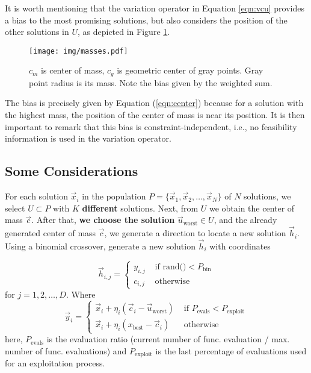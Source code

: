 \documentclass[12pt,letterpape]{article}
\begin{document}
It is worth mentioning that the variation operator in Equation \ref{eqn:vcu} 
provides a bias to the most promising solutions, but also considers the position 
of the other solutions in $U$, as depicted in  Figure \ref{fig:masses}. 

\begin{figure}[!ht]
	\centering
	\texttt{[image: img/masses.pdf]}
	\caption{$c_m$ is center of mass, $c_g$ is geometric center of gray points. %
	Gray point radius is its mass. Note the bias given by the weighted sum.}
	\label{fig:masses}       %
\end{figure}
%
%
The bias is precisely given by Equation (\ref{eqn:center}) because for a solution 
with the highest mass, the position of the center of mass is near  
its position. It is then important to remark that this bias is constraint-independent, i.e., 
no feasibility information is used in the variation operator. 
%

\subsection{Some Considerations} %
\label{sub:some_considerations}


For each solution $\vec{x}_i $ in the population $P = \{ \vec{x}_1, \vec{x}_2, \ldots, \vec{x}_{N} \} $ of $N$ 
solutions, we select $U \subset P $ with $K$ \textbf{different} solutions. Next, 
from $U$ we obtain the center of mass $\vec{c}$. After that, \textbf{we choose the solution} $\vec{u}_{\text{worst}} \in U$,  
and the already generated center of mass $\vec{c}$, we generate a direction 
to locate a new solution $ \vec{h}_i$. Using a binomial crossover, generate a new solution $\vec{h}_{i}$ with coordinates

%
\begin{equation}
	\vec{h}_{i,j} = 
	\begin{cases}
		y_{i,j} & \text{ if rand()} < P_{\text{bin}}\\
		c_{i,j} & \text{ otherwise}
	\end{cases}
	\label{eqn:newSol}
\end{equation}
% 
for $j = 1,2,\ldots,D$. Where 
%
\begin{equation}
	\vec{y}_i = 
	\begin{cases}
		\vec{x}_i + \eta _{i} ( \vec{c}_i - \vec{u}_{ \text{worst} } ) 
		       & \text{ if } P_{\text{evals}} < P_{\text{exploit}} \\
		\vec{x}_i + \eta _{i} ( x_{\text{best}} - \vec{c}_i)
		       & \text{ otherwise}
	\end{cases}
	\label{eqn:vcu}
\end{equation}
%
here, $ P_{\text{evals}}$ is the evaluation ratio (current number of func. evaluation / max. number of func. evaluations) and  $P_{\text{exploit}}$ is the last percentage of evaluations used for an exploitation process.
%
\end{document}
